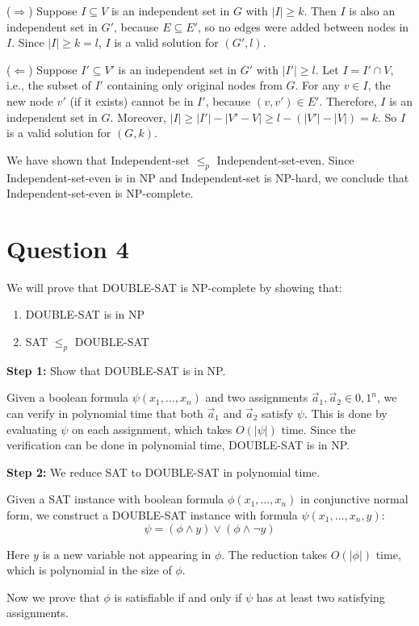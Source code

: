 \documentclass{article}
\begin{document}
($\Rightarrow$) Suppose $I \subseteq V$ is an independent set in $G$ with $|I| \geq k$. Then $I$ is also an independent set in $G'$, because $E \subseteq E'$, so no edges were added between nodes in $I$. Since $|I| \geq k = l$, $I$ is a valid solution for $(G',l)$.

($\Leftarrow$) Suppose $I' \subseteq V'$ is an independent set in $G'$ with $|I'| \geq l$. Let $I = I' \cap V$, i.e., the subset of $I'$ containing only original nodes from $G$. For any $v \in I$, the new node $v'$ (if it exists) cannot be in $I'$, because $(v,v') \in E'$. Therefore, $I$ is an independent set in $G$. Moreover, $|I| \geq |I'| - |V'-V| \geq l - (|V'|-|V|) = k$. So $I$ is a valid solution for $(G,k)$.

We have shown that Independent-set $\leq_p$ Independent-set-even. Since Independent-set-even is in NP and Independent-set is NP-hard, we conclude that Independent-set-even is NP-complete.

\section{Question 4}

We will prove that DOUBLE-SAT is NP-complete by showing that:
\begin{enumerate}
\item DOUBLE-SAT is in NP
\item SAT $\leq_p$ DOUBLE-SAT
\end{enumerate}

\textbf{Step 1:} Show that DOUBLE-SAT is in NP.

Given a boolean formula $\psi(x_1,\ldots,x_n)$ and two assignments $\vec{a}_1, \vec{a}_2 \in {0,1}^n$, we can verify in polynomial time that both $\vec{a}_1$ and $\vec{a}_2$ satisfy $\psi$. This is done by evaluating $\psi$ on each assignment, which takes $O(|\psi|)$ time. Since the verification can be done in polynomial time, DOUBLE-SAT is in NP.

\textbf{Step 2:} We reduce SAT to DOUBLE-SAT in polynomial time.

Given a SAT instance with boolean formula $\phi(x_1,\ldots,x_n)$ in conjunctive normal form, we construct a DOUBLE-SAT instance with formula $\psi(x_1,\ldots,x_n,y)$:
$$\psi = (\phi \wedge y) \vee (\phi \wedge \neg y)$$

Here $y$ is a new variable not appearing in $\phi$. The reduction takes $O(|\phi|)$ time, which is polynomial in the size of $\phi$.

Now we prove that $\phi$ is satisfiable if and only if $\psi$ has at least two satisfying assignments.
\end{document}
